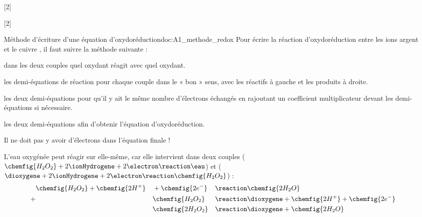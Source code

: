 [2]

[2]

\begin{doc}{Méthode d'écriture d'une équation d'oxydoréduction}{doc:A1_methode_redox}
  Pour écrire la réaction d'oxydoréduction entre les ions argent \ionArgent et le cuivre , il faut suivre la méthode suivante :
  \begin{enumeration}
    \item {} dans les deux couples quel oxydant réagit avec quel oxydant.
    \item {} les demi-équations de réaction pour chaque couple dans le « bon » sens, avec les réactifs à gauche et les produits à droite.
    \item {} les deux demi-équations pour qu'il y ait le même nombre d'électrons échangés en rajoutant un coefficient multiplicateur devant les demi-équations si nécessaire. 
    \item {} les deux demi-équations afin d'obtenir l'équation d'oxydoréduction.
  \end{enumeration}
  \attention Il ne doit pas y avoir d'électrons dans l'équation finale !

  \exemple L'eau oxygénée peut réagir sur elle-même, car elle intervient dans deux couples 
  ($\chemfig{H_2O_2} + 2\ionHydrogene + 2\electron \reaction \eau$) et
  ($\dioxygene + 2\ionHydrogene + 2\electron \reaction \chemfig{H_2O_2}$) : 
  \begin{alignat*}{3}
     & \chemfig{H_2O_2} + \chemfig{2H^{+}} &&+ \chemfig{2e^{-}} &&\reaction \chemfig{2H_2O} \\
    +& &&\chemfig{H_2O_2}  &&\reaction \dioxygene + \chemfig{2H^{+}} + \chemfig{2e^{-}} \\
     & &&\chemfig{2H_2O_2} &&\reaction \dioxygene + \chemfig{2H_2O}
  \end{alignat*}
\end{doc}

